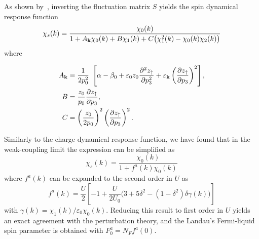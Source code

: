 \documentclass[showpacs,amsmath,twocolumn,floatfix]{revtex4-1}
\begin{document}
As shown by~\cite{Lav90,li91,Zim97}, inverting the fluctuation matrix $S$ yields the spin dynamical response function
\begin{equation}
 \chi_s(k) = \frac{\chi_0(k)}{1 + A_{\bf k} \chi_0(k) + B \chi_1(k) + C \big( \chi_1^2(k) 
 - \chi_0(k) \chi_2(k) \big)}
 \label{eq:chi_s}
\end{equation}
where

\begin{align}
 A_{\bf k} & = \frac{1}{2 p_0^2} \left[ \alpha - \beta_0 + \varepsilon_0 z_0 
 \frac{\partial^2 z_{\uparrow}}{\partial p_3^2} + \varepsilon_{\bf k} 
 \left( \frac{\partial z_{\uparrow}}{\partial p_3}\right)^2 \right], \nonumber \\
 B & = \frac{z_0}{p_0} \frac{\partial z_{\uparrow}}{\partial p_3}, \nonumber \\
 C & = \left( \frac{z_0}{2 p_0}\right)^2 \left( \frac{\partial z_{\uparrow}}
 {\partial p_3}\right)^2. 
\end{align}




Similarly to the charge dynamical response function, we have found that in the 
weak-coupling limit the expression can be simplified as
\begin{equation}
 \chi_s(k)= \frac{\chi_0(k)}{1 + f^a(k) \chi_0(k)}
\end{equation}
where $f^a(k)$ can be expanded to the second order in $U$ as
\begin{equation}
 f^a(k) = \frac{U}{2} \left[ -1 + \frac{U}{2 U_0} \bigg( 3 + 5 \delta^2 - (1-\delta^2)
 \delta \gamma(k)\bigg)\right]
\end{equation}
with $\gamma(k)=\chi_1(k)/\varepsilon_0 \chi_0(k)$. Reducing this result to
first order in $U$ yields an exact agreement with the perturbation theory, and 
the Landau's Fermi-liquid spin parameter is obtained with $F_0^a = N_F f^a(0)$.
\end{document}
